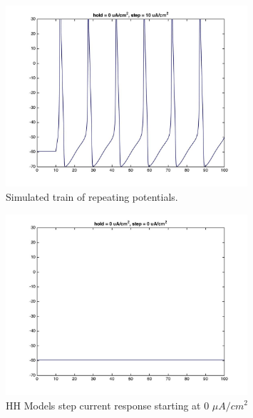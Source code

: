 \documentclass{beamer}
\begin{document}
\begin{frame}
  \begin{figure}
    \centering
    \includegraphics[width = 0.8\textwidth]{./images/current_0_10.jpg}
    \caption{Simulated train of repeating potentials.}
  \end{figure}
\end{frame}
\begin{frame}
  \begin{figure}
    \centering
    \includegraphics[width = 0.8\textwidth]{./images/current_0_0.jpg}
    \caption{HH Models step current response starting at 0 $\mu A/cm^2$}
  \end{figure}
\end{frame}
\end{document}
